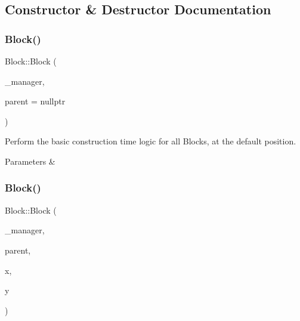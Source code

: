 \subsection{Constructor \& Destructor Documentation}
\mbox{\label{class_block_a3f8aa5b6f9bc441c52b2fe94c97822f9}} 
\subsubsection{\texorpdfstring{Block()}{Block()}\hspace{0.1cm}{\footnotesize\ttfamily [1/3]}}
{\footnotesize\ttfamily Block\+::\+Block (\begin{DoxyParamCaption}\item[{\mbox{\hyperlink{class_game_manager}{Game\+Manager}} $\ast$}]{\+\_\+manager,  }\item[{\mbox{\hyperlink{class_game_entity}{Game\+Entity}} $\ast$}]{parent = {\ttfamily nullptr} }\end{DoxyParamCaption})\hspace{0.3cm}{\ttfamily [protected]}}



Perform the basic construction time logic for all Blocks, at the default position. 


\begin{DoxyParams}{Parameters}
{\em } & \\
\hline
\end{DoxyParams}
\mbox{\label{class_block_a879d40dca10328229b91b4580d803eb4}} 
\subsubsection{\texorpdfstring{Block()}{Block()}\hspace{0.1cm}{\footnotesize\ttfamily [2/3]}}
{\footnotesize\ttfamily Block\+::\+Block (\begin{DoxyParamCaption}\item[{\mbox{\hyperlink{class_game_manager}{Game\+Manager}} $\ast$}]{\+\_\+manager,  }\item[{\mbox{\hyperlink{class_game_entity}{Game\+Entity}} $\ast$}]{parent,  }\item[{float}]{x,  }\item[{float}]{y }\end{DoxyParamCaption})\hspace{0.3cm}{\ttfamily [protected]}}



